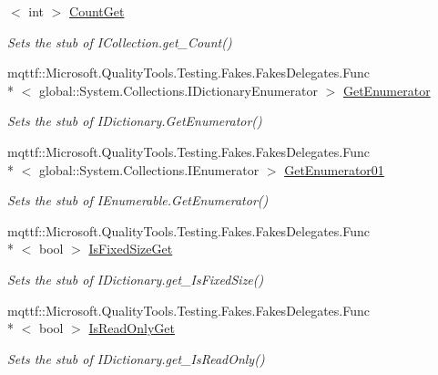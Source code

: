 \begin{DoxyCompactItemize}
$<$ int $>$ \hyperlink{class_system_1_1_collections_1_1_fakes_1_1_stub_i_dictionary_a7886623df1ec5a535229ba67ccc36a90}{Count\-Get}
\begin{DoxyCompactList}\small\item\em Sets the stub of I\-Collection.\-get\-\_\-\-Count()\end{DoxyCompactList}\item 
mqttf\-::\-Microsoft.\-Quality\-Tools.\-Testing.\-Fakes.\-Fakes\-Delegates.\-Func\\*
$<$ global\-::\-System.\-Collections.\-I\-Dictionary\-Enumerator $>$ \hyperlink{class_system_1_1_collections_1_1_fakes_1_1_stub_i_dictionary_a9d606078febd3c0e3f12ba0fe6c0121a}{Get\-Enumerator}
\begin{DoxyCompactList}\small\item\em Sets the stub of I\-Dictionary.\-Get\-Enumerator()\end{DoxyCompactList}\item 
mqttf\-::\-Microsoft.\-Quality\-Tools.\-Testing.\-Fakes.\-Fakes\-Delegates.\-Func\\*
$<$ global\-::\-System.\-Collections.\-I\-Enumerator $>$ \hyperlink{class_system_1_1_collections_1_1_fakes_1_1_stub_i_dictionary_a4d8e77aa063e559a5daee36842c55f24}{Get\-Enumerator01}
\begin{DoxyCompactList}\small\item\em Sets the stub of I\-Enumerable.\-Get\-Enumerator()\end{DoxyCompactList}\item 
mqttf\-::\-Microsoft.\-Quality\-Tools.\-Testing.\-Fakes.\-Fakes\-Delegates.\-Func\\*
$<$ bool $>$ \hyperlink{class_system_1_1_collections_1_1_fakes_1_1_stub_i_dictionary_a0f1a9120cc145ce9144cd3aca2fa94d7}{Is\-Fixed\-Size\-Get}
\begin{DoxyCompactList}\small\item\em Sets the stub of I\-Dictionary.\-get\-\_\-\-Is\-Fixed\-Size()\end{DoxyCompactList}\item 
mqttf\-::\-Microsoft.\-Quality\-Tools.\-Testing.\-Fakes.\-Fakes\-Delegates.\-Func\\*
$<$ bool $>$ \hyperlink{class_system_1_1_collections_1_1_fakes_1_1_stub_i_dictionary_a6a9b5db28a1c61c0e2fd12baabd2379a}{Is\-Read\-Only\-Get}
\begin{DoxyCompactList}\small\item\em Sets the stub of I\-Dictionary.\-get\-\_\-\-Is\-Read\-Only()\end{DoxyCompactList}\item 

\end{DoxyCompactItemize}
